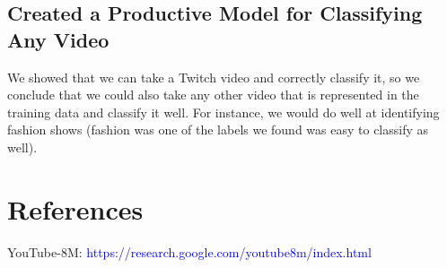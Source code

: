 \documentclass{article}
\begin{document}
\subsection{Created a Productive Model for Classifying Any Video}
We showed that we can take a Twitch video and correctly classify it, so we conclude that we could also take any other video that is represented in the training data and classify it well. For instance, we would do well at identifying fashion shows (fashion was one of the labels we found was easy to classify as well).


\section{References}

YouTube-8M: \textcolor{blue}{https://research.google.com/youtube8m/index.html}






%
\end{document}

